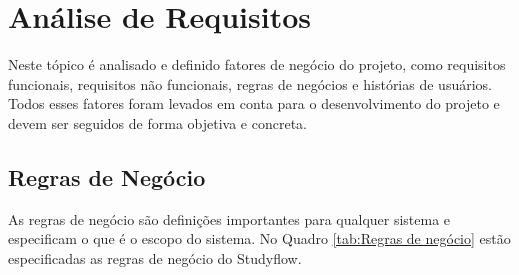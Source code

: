 \newpage
\section{Análise de Requisitos}

Neste tópico é analisado e definido fatores de negócio do projeto, como requisitos funcionais, requisitos não funcionais, regras de negócios e histórias de usuários. Todos esses fatores foram levados em conta para o desenvolvimento do projeto e devem ser seguidos de forma objetiva e concreta.

\subsection{Regras de Negócio}

As regras de negócio são definições importantes para qualquer sistema e especificam o que é o escopo do sistema. No Quadro \ref{tab:Regras de negócio} estão especificadas as regras de negócio do Studyflow.

